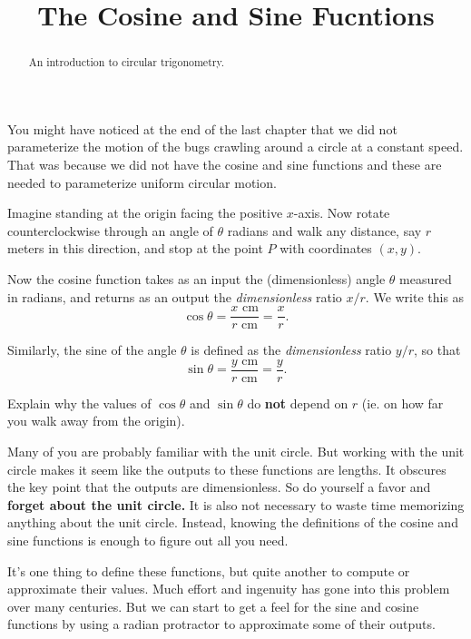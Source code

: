 \documentclass{ximera}
\title{The Cosine and Sine Fucntions}
\begin{document}
\begin{abstract}
An introduction to circular trigonometry.
\end{abstract}
\maketitle

You might have noticed at the end of the last chapter that we did not parameterize the motion of the bugs crawling around a circle at a constant speed. That was because we did not have the cosine and sine functions and these are needed to parameterize uniform circular motion.

Imagine standing at the origin facing the positive $x$-axis. Now rotate counterclockwise through an angle of $\theta$ radians and walk any distance, say $r$ meters in this direction, and stop at the point $P$ with coordinates $(x,y)$.

Now the cosine function takes as an input the (dimensionless) angle $\theta$ measured in radians, and returns as an output the \emph{dimensionless} ratio $x/r$. We write this as 
\[
   \cos \theta = \frac{x \text{ cm}}{r \text{ cm}} = \frac{x}{r} .
\]

Similarly, the sine of the angle $\theta$ is defined as the \emph{dimensionless} ratio $y/r$, so that
\[
   \sin \theta = \frac{y \text{ cm}}{r \text{ cm}} = \frac{y}{r} .
\]

\begin{question} \label{Q1:Cosine}
Explain why the values of $\cos \theta$ and $\sin\theta$ do {\bf not} depend on $r$ (ie. on how far you walk away from the origin). 
\end{question}



Many of you are probably familiar with the unit circle. But working with the unit circle makes it seem like the outputs to these functions are lengths. It obscures the key point that the outputs are dimensionless. So do yourself a favor and {\bf forget about the unit circle.} It is also not necessary to waste time memorizing anything about the unit circle. Instead, knowing the definitions of the cosine and sine functions is enough to figure out all you need.

It's one thing to define these functions, but quite another to compute or approximate their values. Much effort and ingenuity has gone into this problem over many centuries. But we can start to get a feel for the sine and cosine functions by using a radian protractor to approximate some of their outputs.
\end{document}
